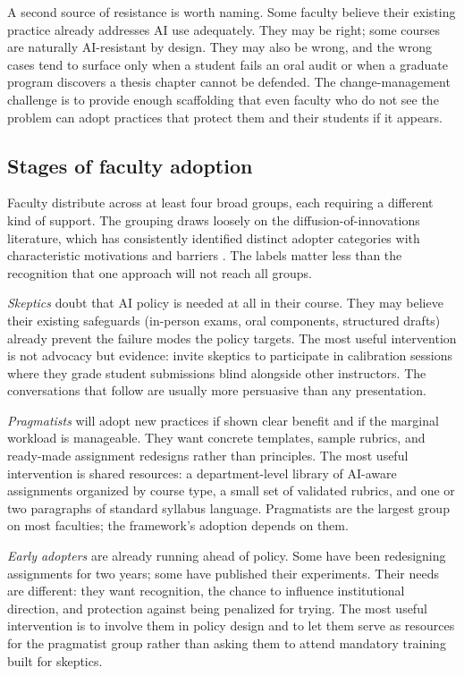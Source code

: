 \documentclass{SIAMbook2023}
\begin{document}
A second source of resistance is worth naming. Some faculty believe their existing practice already addresses AI use adequately. They may be right; some courses are naturally AI-resistant by design. They may also be wrong, and the wrong cases tend to surface only when a student fails an oral audit or when a graduate program discovers a thesis chapter cannot be defended. The change-management challenge is to provide enough scaffolding that even faculty who do not see the problem can adopt practices that protect them and their students if it appears.

\subsection{Stages of faculty adoption}
\label{u:subsec:adoption-stages}%
%

Faculty distribute across at least four broad groups, each requiring a different kind of support. The grouping draws loosely on the diffusion-of-innovations literature, which has consistently identified distinct adopter categories with characteristic motivations and barriers \citep{rogers2003diffusion}. The labels matter less than the recognition that one approach will not reach all groups.

\textit{Skeptics} doubt that AI policy is needed at all in their course. They may believe their existing safeguards (in-person exams, oral components, structured drafts) already prevent the failure modes the policy targets. The most useful intervention is not advocacy but evidence: invite skeptics to participate in calibration sessions where they grade student submissions blind alongside other instructors. The conversations that follow are usually more persuasive than any presentation.

\textit{Pragmatists} will adopt new practices if shown clear benefit and if the marginal workload is manageable. They want concrete templates, sample rubrics, and ready-made assignment redesigns rather than principles. The most useful intervention is shared resources: a department-level library of AI-aware assignments organized by course type, a small set of validated rubrics, and one or two paragraphs of standard syllabus language. Pragmatists are the largest group on most faculties; the framework's adoption depends on them.

\textit{Early adopters} are already running ahead of policy. Some have been redesigning assignments for two years; some have published their experiments. Their needs are different: they want recognition, the chance to influence institutional direction, and protection against being penalized for trying. The most useful intervention is to involve them in policy design and to let them serve as resources for the pragmatist group rather than asking them to attend mandatory training built for skeptics.
\end{document}
